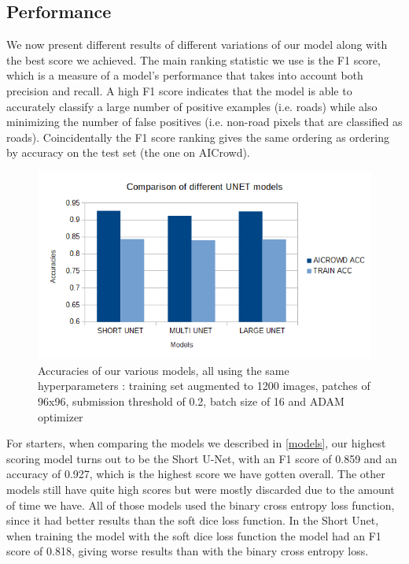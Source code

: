 \documentclass[10pt,conference,compsocconf]{IEEEtran}
\begin{document}
\subsection{Performance}
We now present different results of different variations of our model along with the best score we achieved. The main ranking statistic we use is the F1 score, which is a measure of a model's performance that takes into account both precision and recall. A high F1 score indicates that the model is able to accurately classify a large number of positive examples (i.e. roads) while also minimizing the number of false positives (i.e. non-road pixels that are classified as roads). Coincidentally the F1 score ranking gives the same ordering as ordering by accuracy on the test set (the one on AICrowd).
\begin{figure}[H]
    \centering
    \includegraphics[scale = 0.4]{models_graph.png} %
    \caption{Accuracies of our various models, all using the same hyperparameters : training set augmented to 1200 images, patches of 96x96, submission threshold of 0.2, batch size of 16 and ADAM optimizer}
\end{figure}
For starters, when comparing the models we described in \ref{models}, our highest scoring model turns out to be the Short U-Net, with an F1 score of 0.859 and an accuracy of 0.927, which is the highest score we have gotten overall. The other models still have quite high scores but were mostly discarded due to the amount of time we have.
\newline
All of those models used the binary cross entropy loss function, since it had better results than the soft dice loss function. In the Short Unet, when training the model with the soft dice loss function the model had an F1 score of 0.818, giving worse results than with the binary cross entropy loss.
\end{document}
